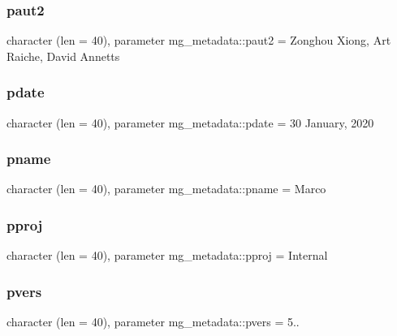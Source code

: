 \mbox{\label{namespacemg__metadata_a57994bf5e2ca111728f864404d2819bd}} 
\subsubsection{\texorpdfstring{paut2}{paut2}}
{\footnotesize\ttfamily character (len = 40), parameter mg\+\_\+metadata\+::paut2 = \textquotesingle{}Zonghou Xiong, Art Raiche, David Annetts\textquotesingle{}}

\mbox{\label{namespacemg__metadata_a4106e803f80dc8c6ab3c50695fb54f5d}} 
\subsubsection{\texorpdfstring{pdate}{pdate}}
{\footnotesize\ttfamily character (len = 40), parameter mg\+\_\+metadata\+::pdate = \textquotesingle{}30 January, 2020\textquotesingle{}}

\mbox{\label{namespacemg__metadata_ad684795e52fbc1cdd49b371b212a9e80}} 
\subsubsection{\texorpdfstring{pname}{pname}}
{\footnotesize\ttfamily character (len = 40), parameter mg\+\_\+metadata\+::pname = \textquotesingle{}Marco\textquotesingle{}}

\mbox{\label{namespacemg__metadata_afefd0fba4ecb62a3ed3c8dcfd479c2d7}} 
\subsubsection{\texorpdfstring{pproj}{pproj}}
{\footnotesize\ttfamily character (len = 40), parameter mg\+\_\+metadata\+::pproj = \textquotesingle{}Internal\textquotesingle{}}

\mbox{\label{namespacemg__metadata_a12335b83f4d2c57e111fad11368698d3}} 
\subsubsection{\texorpdfstring{pvers}{pvers}}
{\footnotesize\ttfamily character (len = 40), parameter mg\+\_\+metadata\+::pvers = \textquotesingle{}5..\textquotesingle{}}

